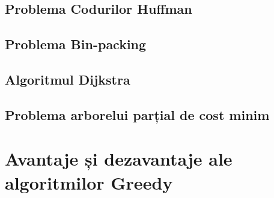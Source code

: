\subsection{Problema Codurilor Huffman}
\subsection{Problema Bin-packing}
\subsection{Algoritmul Dijkstra}
\subsection{Problema arborelui parțial de cost minim}

\section{Avantaje și dezavantaje ale algoritmilor Greedy}				
